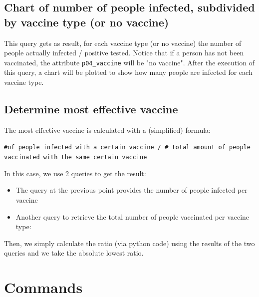 \documentclass{article}
\newenvironment{code}{\captionsetup{type=listing}}{}
\begin{document}
		\subsection{Chart of number of people infected, subdivided by vaccine type (or no vaccine)}
		\begin{code}
		\end{code}
		This query gets as result, for each vaccine type (or no vaccine) the number of people actually infected / positive tested. Notice that if a person has not been vaccinated, the attribute \texttt{p04\_vaccine} will be "no vaccine". After the execution of this query, a chart will be plotted to show how many people are infected for each vaccine type.
						  
		\subsection{Determine most effective vaccine}
		The most effective vaccine is calculated with a (simplified) formula:
		\begin{center}
			\texttt{\#of people infected with a certain vaccine / \# total amount of people vaccinated with the same certain vaccine}
		\end{center}
		In this case, we use 2 queries to get the result:
		\begin{itemize}
			\item The query at the previous point provides the number of people infected per vaccine
			\item Another query to retrieve the total number of people vaccinated per vaccine type:
		\end{itemize}
		\begin{code}
		\end{code}
		Then, we simply calculate the ratio (via python code) using the results of the two queries and we take the absolute lowest ratio.
						  
		\section{Commands}
\end{document}

